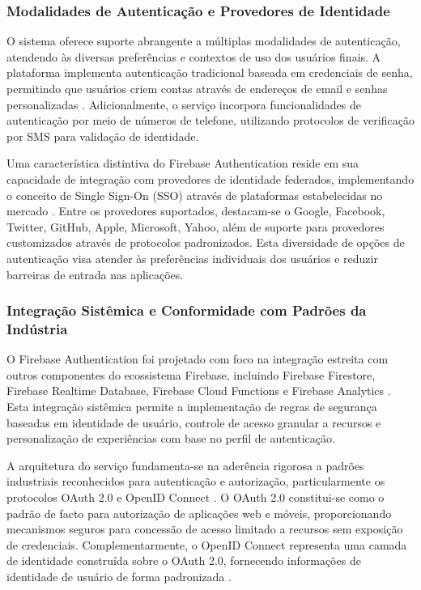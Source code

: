 \subsubsection{Modalidades de Autenticação e Provedores de Identidade}

O sistema oferece suporte abrangente a múltiplas modalidades de autenticação, atendendo às diversas preferências e contextos de uso dos usuários finais. A plataforma implementa autenticação tradicional baseada em credenciais de senha, permitindo que usuários criem contas através de endereços de email e senhas personalizadas \cite{stallings2023cryptography}. Adicionalmente, o serviço incorpora funcionalidades de autenticação por meio de números de telefone, utilizando protocolos de verificação por SMS para validação de identidade.

Uma característica distintiva do Firebase Authentication reside em sua capacidade de integração com provedores de identidade federados, implementando o conceito de Single Sign-On (SSO) através de plataformas estabelecidas no mercado \cite{jones2022federated}. Entre os provedores suportados, destacam-se o Google, Facebook, Twitter, GitHub, Apple, Microsoft, Yahoo, além de suporte para provedores customizados através de protocolos padronizados. Esta diversidade de opções de autenticação visa atender às preferências individuais dos usuários e reduzir barreiras de entrada nas aplicações.

\subsubsection{Integração Sistêmica e Conformidade com Padrões da Indústria}

O Firebase Authentication foi projetado com foco na integração estreita com outros componentes do ecossistema Firebase, incluindo Firebase Firestore, Firebase Realtime Database, Firebase Cloud Functions e Firebase Analytics \cite{firebase2023ecosystem}. Esta integração sistêmica permite a implementação de regras de segurança baseadas em identidade de usuário, controle de acesso granular a recursos e personalização de experiências com base no perfil de autenticação.

A arquitetura do serviço fundamenta-se na aderência rigorosa a padrões industriais reconhecidos para autenticação e autorização, particularmente os protocolos OAuth 2.0 e OpenID Connect \cite{hardt2012oauth}. O OAuth 2.0 constitui-se como o padrão de facto para autorização de aplicações web e móveis, proporcionando mecanismos seguros para concessão de acesso limitado a recursos sem exposição de credenciais. Complementarmente, o OpenID Connect representa uma camada de identidade construída sobre o OAuth 2.0, fornecendo informações de identidade de usuário de forma padronizada \cite{sakimura2014openid}.

